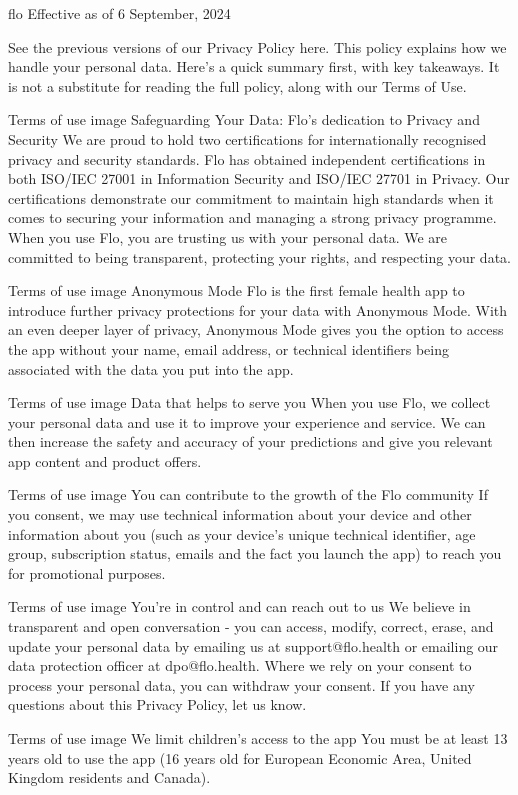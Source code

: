 flo
Effective as of 6 September, 2024 

See the previous versions of our Privacy Policy here. This policy explains how we handle your personal data. Here’s a quick summary first, with key takeaways. It is not a substitute for reading the full policy, along with our Terms of Use.

Terms of use image
Safeguarding Your Data: Flo’s dedication to Privacy and Security
We are proud to hold two certifications for internationally recognised privacy and security standards. Flo has obtained independent certifications in both ISO/IEC 27001 in Information Security and ISO/IEC 27701 in Privacy. Our certifications demonstrate our commitment to maintain high standards when it comes to securing your information and managing a strong privacy programme. When you use Flo, you are trusting us with your personal data. We are committed to being transparent, protecting your rights, and respecting your data. 

Terms of use image
Anonymous Mode
Flo is the first female health app to introduce further privacy protections for your data with Anonymous Mode. With an even deeper layer of privacy, Anonymous Mode gives you the option to access the app without your name, email address, or technical identifiers being associated with the data you put into the app.

Terms of use image
Data that helps to serve you
When you use Flo, we collect your personal data and use it to improve your experience and service. We can then increase the safety and accuracy of your predictions and give you relevant app content and product offers.

Terms of use image
You can contribute to the growth of the Flo community
If you consent, we may use technical information about your device and other information about you (such as your device’s unique technical identifier, age group, subscription status, emails and the fact you launch the app) to reach you for promotional purposes.

Terms of use image
You’re in control and can reach out to us
We believe in transparent and open conversation - you can access, modify, correct, erase, and update your personal data by emailing us at support@flo.health or emailing our data protection officer at dpo@flo.health. Where we rely on your consent to process your personal data, you can withdraw your consent. If you have any questions about this Privacy Policy, let us know. 

Terms of use image
We limit children’s access to the app
You must be at least 13 years old to use the app (16 years old for European Economic Area, United Kingdom residents and Canada).

